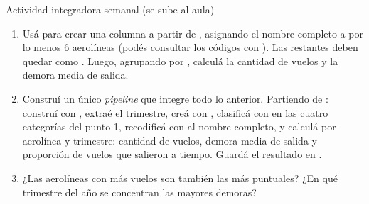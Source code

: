 \documentclass[8pt]{beamer}
\begin{document}
	\begin{frame}[fragile]{Actividad integradora semanal (se sube al aula)}
		\begin{enumerate}[start = 4]
			\item Usá  para crear una columna  a partir de , asignando el nombre completo a por lo menos 6 aerolíneas (podés consultar los códigos con ). Las restantes deben quedar como . Luego, agrupando por , calculá la cantidad de vuelos y la demora media de salida.

			\item Construí un único \textit{pipeline} que integre todo lo anterior. Partiendo de : construí  con , extraé el trimestre, creá  con , clasificá  con  en las cuatro categorías del punto 1, recodificá  con  al nombre completo, y calculá por aerolínea y trimestre: cantidad de vuelos, demora media de salida y proporción de vuelos que salieron a tiempo. Guardá el resultado en .

			\item {} ¿Las aerolíneas con más vuelos son también las más puntuales? ¿En qué trimestre del año se concentran las mayores demoras?
		\end{enumerate}
	\end{frame}
\end{document}
